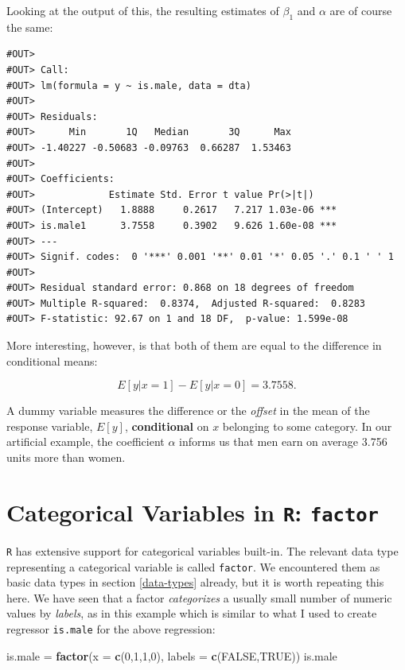 \documentclass[]{book}
\newenvironment{Shaded}{\begin{snugshade}}{\end{snugshade}}
\newcommand{\KeywordTok}[1]{\textcolor[rgb]{0.13,0.29,0.53}{\textbf{#1}}}
\newcommand{\DataTypeTok}[1]{\textcolor[rgb]{0.13,0.29,0.53}{#1}}
\newcommand{\DecValTok}[1]{\textcolor[rgb]{0.00,0.00,0.81}{#1}}
\newcommand{\StringTok}[1]{\textcolor[rgb]{0.31,0.60,0.02}{#1}}
\newcommand{\OtherTok}[1]{\textcolor[rgb]{0.56,0.35,0.01}{#1}}
\newcommand{\NormalTok}[1]{#1}
\newenvironment{note}{\begin{tcolorbox}[colback=blue!5!white,colframe=blue!75!black,title=\textbf{Note:}]}{\end{tcolorbox}}
\theoremstyle{definition}
\theoremstyle{definition}
\theoremstyle{definition}
\theoremstyle{remark}
\begin{document}
Looking at the output of this, the resulting estimates of \(\beta_1\)
and \(\alpha\) are of course the same:

\begin{verbatim}
#OUT> 
#OUT> Call:
#OUT> lm(formula = y ~ is.male, data = dta)
#OUT> 
#OUT> Residuals:
#OUT>      Min       1Q   Median       3Q      Max 
#OUT> -1.40227 -0.50683 -0.09763  0.66287  1.53463 
#OUT> 
#OUT> Coefficients:
#OUT>             Estimate Std. Error t value Pr(>|t|)    
#OUT> (Intercept)   1.8888     0.2617   7.217 1.03e-06 ***
#OUT> is.male1      3.7558     0.3902   9.626 1.60e-08 ***
#OUT> ---
#OUT> Signif. codes:  0 '***' 0.001 '**' 0.01 '*' 0.05 '.' 0.1 ' ' 1
#OUT> 
#OUT> Residual standard error: 0.868 on 18 degrees of freedom
#OUT> Multiple R-squared:  0.8374,  Adjusted R-squared:  0.8283 
#OUT> F-statistic: 92.67 on 1 and 18 DF,  p-value: 1.599e-08
\end{verbatim}

More interesting, however, is that both of them are equal to the
difference in conditional means:

\[E[y|x=1] - E[y|x=0]=3.7558.\]

\begin{note}
A dummy variable measures the difference or the \emph{offset} in the
mean of the response variable, \(E[y]\), \textbf{conditional} on \(x\)
belonging to some category. In our artificial example, the coefficient
\(\alpha\) informs us that men earn on average 3.756 units more than
women.
\end{note}

\section{\texorpdfstring{Categorical Variables in \texttt{R}:
\texttt{factor}}{Categorical Variables in R: factor}}\label{categorical-variables-in-r-factor}

\texttt{R} has extensive support for categorical variables built-in. The
relevant data type representing a categorical variable is called
\texttt{factor}. We encountered them as basic data types in section
\ref{data-types} already, but it is worth repeating this here. We have
seen that a factor \emph{categorizes} a usually small number of numeric
values by \emph{labels}, as in this example which is similar to what I
used to create regressor \texttt{is.male} for the above regression:

\begin{Shaded}
\begin{Highlighting}[]
\NormalTok{is.male =}\StringTok{ }\KeywordTok{factor}\NormalTok{(}\DataTypeTok{x =} \KeywordTok{c}\NormalTok{(}\DecValTok{0}\NormalTok{,}\DecValTok{1}\NormalTok{,}\DecValTok{1}\NormalTok{,}\DecValTok{0}\NormalTok{), }\DataTypeTok{labels =} \KeywordTok{c}\NormalTok{(}\OtherTok{FALSE}\NormalTok{,}\OtherTok{TRUE}\NormalTok{))}
\NormalTok{is.male}
\end{Highlighting}
\end{Shaded}
\end{document}
